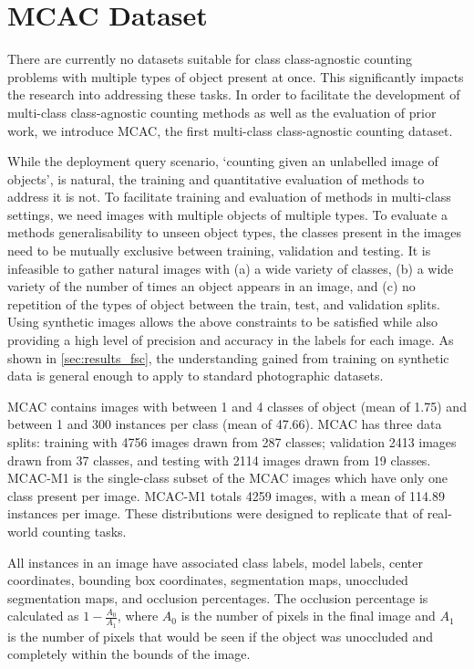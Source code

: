 \documentclass[runningheads]{llncs}
\begin{document}
\section{MCAC Dataset}\label{sec:MCAC}

There are currently no datasets suitable for class class-agnostic counting problems with multiple types of object present at once. This significantly impacts the research into addressing these tasks. 
In order to facilitate the development of multi-class class-agnostic counting methods as well as the evaluation of prior work, we introduce MCAC, the first multi-class class-agnostic counting dataset.

While the deployment query scenario, `counting given an unlabelled image of objects', is natural, the training and quantitative evaluation of methods to address it is not.
To facilitate training and evaluation of methods in multi-class settings, we need images with multiple objects of multiple types. 
To evaluate a methods generalisability to unseen object types, the classes present in the images need to be mutually exclusive between training, validation and testing.
It is infeasible to gather natural images with (a) a wide variety of classes, (b) a wide variety of the number of times an object appears in an image, and (c) no repetition of the types of object between the train, test, and validation splits. Using synthetic images allows the above constraints to be satisfied while also providing a high level of precision and accuracy in the labels for each image. 
As shown in \cref{sec:results_fsc}, the understanding gained from training on synthetic data is general enough to apply to standard photographic datasets.

MCAC contains images with between 1 and 4 classes of object (mean of 1.75) and between 1 and 300 instances per class (mean of 47.66). 
MCAC has three data splits: training with 4756 images drawn from 287 classes; validation 2413 images drawn from 37 classes, and testing with 2114 images drawn from 19 classes.
MCAC-M1 is the single-class subset of the MCAC images which have only one class present per image. MCAC-M1 totals 4259 images, with a mean of 114.89 instances per image. These distributions were designed to replicate that of real-world counting tasks.

All instances in an image have associated class labels, model labels, center coordinates, bounding box coordinates, segmentation maps, unoccluded segmentation maps, and occlusion percentages. The occlusion percentage is calculated as $1 - \frac{A_0}{A_1}$, where $A_0$ is the number of pixels in the final image and $A_1$ is the number of pixels that would be seen if the object was unoccluded and completely within the bounds of the image.
\end{document}
